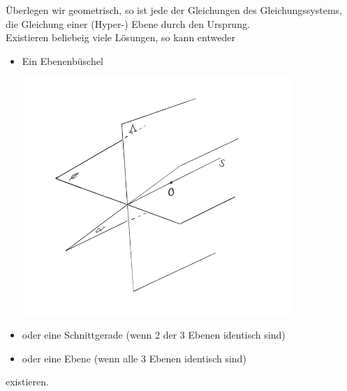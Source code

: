 \documentclass[a4paper,10pt]{report}
\begin{document}
\noindent
Überlegen wir geometrisch, so ist jede der Gleichungen des Gleichungssystems, die Gleichung einer (Hyper-) Ebene durch den Ursprung.\\
Existieren beliebeig viele Lösungen, so kann entweder
\begin{itemize}
	\item
		Ein Ebenenbüschel
		\begin{center}
	 		\includegraphics[width=0.8\textwidth]{imgs/ebenenbueschel.png}
		\end{center}
	\item
		oder eine Schnittgerade (wenn 2 der 3 Ebenen identisch sind)
	\item
		oder eine Ebene (wenn alle 3 Ebenen identisch sind)
\end{itemize}
existieren.
\end{document}
